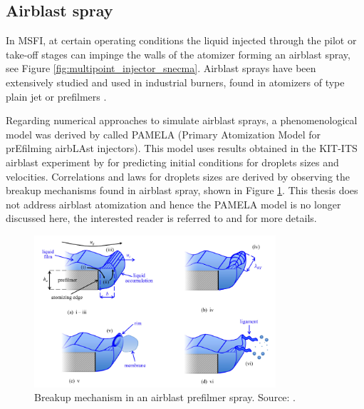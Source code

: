 \subsection{Airblast spray}

In MSFI, at certain operating conditions the liquid injected through the pilot or take-off stages can impinge the walls of the atomizer forming an airblast spray, see Figure \ref{fig:multipoint_injector_snecma}. Airblast sprays have been extensively studied  and used in industrial burners, found in atomizers of type plain jet or prefilmers .

Regarding numerical approaches to simulate airblast sprays, a phenomenological model was derived by  called PAMELA (Primary Atomization Model for prEfilming airbLAst injectors). This model uses results obtained in the KIT-ITS airblast experiment by  for predicting initial conditions for droplets sizes and velocities. Correlations and laws for droplets sizes are derived by observing the breakup mechanisms found in airblast spray, shown in Figure \ref{fig:airblast_breakup_mechanism_chaussonnet}. This thesis does not address airblast atomization and hence the PAMELA model is no longer discussed here, the interested reader is referred to  and  for more details.

\begin{figure}[ht]
    \centering
    \includegraphics[width=0.8\textwidth]{./part1_numerical_approaches/figures_ch3/airblast_breakup_mechanism_chaussonnet}
       \centering
    \caption[Breakup mechanism in an airblast prefilmer spray]{Breakup mechanism in an airblast prefilmer spray. Source: .}
    \label{fig:airblast_breakup_mechanism_chaussonnet}
\end{figure}





